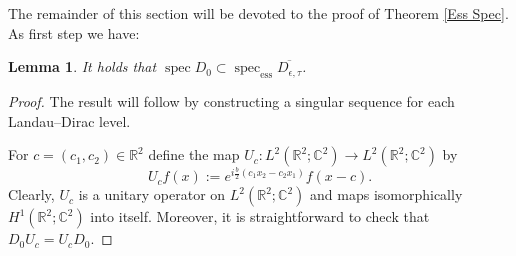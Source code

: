 \documentclass[11pt,a4paper,reqno,oneside]{amsproc}
\DeclareMathOperator{\spec}{spec}
\newcommand{\spece}{\spec_\mathrm{ess}}
\def \rr {{\mathbb R}}
\def \cc {{\mathbb C}}
\numberwithin{equation}{section}
\def \cc {{\mathbb{C}}}
\newtheorem{lemma}[definition]{Lemma}
\begin{document}
The remainder of this section will be devoted to the proof of Theorem \ref{Ess Spec}. As first step we have:
\begin{lemma}\label{Ess Spec1} It holds that $\spec D_0\subset \spece \overline{D_{\epsilon,\tau}}$.
\end{lemma}
\begin{proof} The result will follow by constructing a singular sequence for each Landau--Dirac level. 

For  $c=(c_1,c_2)\in \rr^2$ define the map $U_c: L^2(\rr^2;\cc^2) \longrightarrow L^2(\rr^2;\cc^2)$ by
\[
U_c f (x):= e^{i\frac{b}{2}(c_1 x_2-c_2x_1)}f(x-c).
\]
Clearly, $U_c$ is a unitary operator on $L^2(\rr^2;\cc^2)$ and maps isomorphically $H^1(\rr^2;\cc^2)$ into itself.  Moreover, it is straightforward to check that $D_0 U_c=U_cD_0$.


\end{proof}
\end{document}
